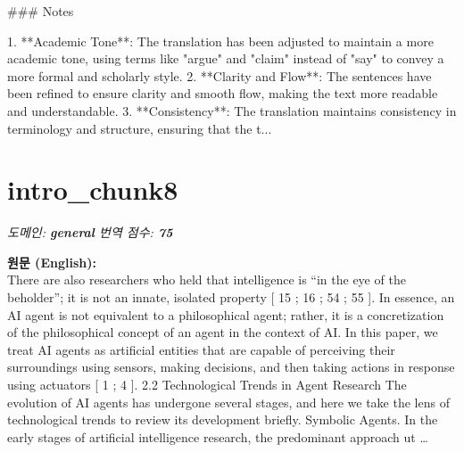 \documentclass[12pt,a4paper]{article}
\begin{document}
\begin{mdframed}[style=ko]
### Notes

1. **Academic Tone**: The translation has been adjusted to maintain a more academic tone, using terms like "argue" and "claim" instead of "say" to convey a more formal and scholarly style.
2. **Clarity and Flow**: The sentences have been refined to ensure clarity and smooth flow, making the text more readable and understandable.
3. **Consistency**: The translation maintains consistency in terminology and structure, ensuring that the t...
\end{mdframed}
\vspace{1em}

\section{intro\_chunk8}
\noindent\textit{\small 도메인: \textbf{general} \quad 번역 점수: \textbf{\color{orange!80!black}75}}
\vspace{0.5em}

\begin{mdframed}[style=orig]
\noindent\textbf{\small 원문 (English):}\\[2pt]
\small There are also researchers who held that intelligence is “in the eye of the beholder”; it is not an innate, isolated property [ 15 ; 16 ; 54 ; 55 ]. In essence, an AI agent is not equivalent to a philosophical agent; rather, it is a concretization of the philosophical concept of an agent in the context of AI. In this paper, we treat AI agents as artificial entities that are capable of perceiving their surroundings using sensors, making decisions, and then taking actions in response using actuators [ 1 ; 4 ]. 2.2 Technological Trends in Agent Research The evolution of AI agents has undergone several stages, and here we take the lens of technological trends to review its development briefly. Symbolic Agents. In the early stages of artificial intelligence research, the predominant approach ut \ldots
\end{mdframed}
\vspace{0.4em}
\end{document}
